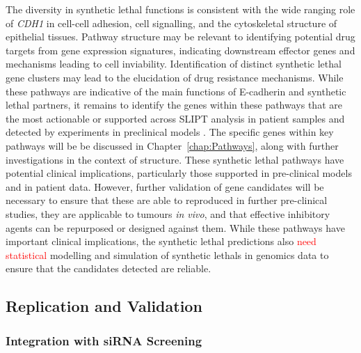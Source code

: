 The diversity in \gls{synthetic lethal} functions is consistent with the wide ranging role of \textit{CDH1} in cell-cell adhesion, cell signalling, and the cytoskeletal structure of epithelial tissues. Pathway structure may be relevant to identifying potential drug targets from \gls{gene expression} signatures, indicating downstream effector genes and mechanisms leading to cell inviability. Identification of distinct \gls{synthetic lethal} gene clusters may lead to the elucidation of drug resistance mechanisms. While these \glspl{pathway} are indicative of the main functions of \gls{E-cadherin} and \gls{synthetic lethal} partners, it remains to identify the genes within these \glspl{pathway} that are the most actionable or supported across \gls{SLIPT} analysis in patient samples and detected by experiments in preclinical models \citep{Chen2014, Telford2015}.  The specific genes within key \glspl{pathway} will be be discussed in Chapter~\ref{chap:Pathways}, along with further investigations in the context of  structure. These \gls{synthetic lethal} \glspl{pathway} have potential clinical implications, particularly those supported in pre-clinical models and in patient  data. However, further validation of gene candidates will be necessary to ensure that these are able to reproduced in further pre-clinical studies, they are applicable to tumours \textit{in vivo}, and that effective inhibitory agents can be repurposed or designed against them. While these \glspl{pathway} have important clinical implications, the \gls{synthetic lethal} predictions also \textcolor{red}{need statistical} modelling and simulation of \glspl{synthetic lethal} in \glspl{genomic}  data to ensure that the candidates detected are reliable.


\subsection{Replication and Validation}

\subsubsection{Integration with siRNA Screening}

